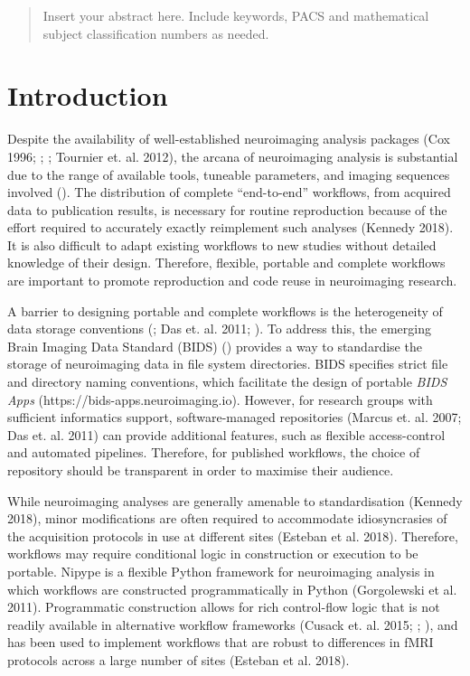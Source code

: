 \begin{abstract}
Insert your abstract here. Include keywords, PACS and mathematical
subject classification numbers as needed.
\end{abstract}

\section{Introduction}
\label{intro}

Despite the availability of well-established neuroimaging analysis
packages (Cox 1996; \cite{smith_advances_2004}; \cite{friston_statistical_2007}; Tournier
et. al. 2012), the arcana of neuroimaging analysis is substantial due to
the range of available tools, tuneable parameters, and imaging sequences
involved (\cite{cusack_automatic_2015}). The distribution of complete
``end-to-end'' workflows, from acquired data to publication results, is
necessary for routine reproduction because of the effort required to
accurately exactly reimplement such analyses (Kennedy 2018). It is also
difficult to adapt existing workflows to new studies without detailed
knowledge of their design. Therefore, flexible, portable and complete
workflows are important to promote reproduction and code reuse in
neuroimaging research.

A barrier to designing portable and complete workflows is the
heterogeneity of data storage conventions (\cite{marcus_extensible_2007}; Das et.
al. 2011; \cite{gorgolewski_brain_2016}). To address this, the emerging Brain
Imaging Data Standard (BIDS) (\cite{gorgolewski_brain_2016}) provides a way
to standardise the storage of neuroimaging data in file system
directories. BIDS specifies strict file and directory naming
conventions, which facilitate the design of portable \emph{BIDS Apps}
(https://bids-apps.neuroimaging.io). However, for research groups with
sufficient informatics support, software-managed repositories (Marcus
et. al. 2007; Das et. al. 2011) can provide additional features, such as
flexible access-control and automated pipelines. Therefore, for
published workflows, the choice of repository should be transparent in
order to maximise their audience.

While neuroimaging analyses are generally amenable to standardisation
(Kennedy 2018), minor modifications are often required to accommodate
idiosyncrasies of the acquisition protocols in use at different sites
(Esteban et al. 2018). Therefore, workflows may require conditional
logic in construction or execution to be portable. Nipype is a flexible
Python framework for neuroimaging analysis in which workflows are
constructed programmatically in Python (Gorgolewski et al. 2011).
Programmatic construction allows for rich control-flow logic that is not
readily available in alternative workflow frameworks (Cusack et. al.
2015; \cite{achterberg_fastr:_2016}; \cite{amstutz_common_2016}), and has been used
to implement workflows that are robust to differences in fMRI protocols
across a large number of sites (Esteban et al. 2018).

